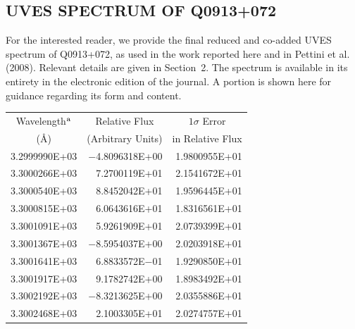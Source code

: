\documentclass[useAMS,usenatbib]{mn2e}
\begin{document}
\newpage
\begin{appendix}
\section{UVES SPECTRUM OF Q0913+072}

For the interested reader, we provide the final 
reduced and co-added UVES spectrum of
Q0913+072, as used in the work reported here and 
in Pettini et al. (2008). Relevant details are given
in Section~2. The spectrum is available
 in its entirety in the electronic edition of 
the journal. A portion is shown here for
guidance regarding its form and content.\\


  \centering
    \begin{tabular}{@{}rrr}
      \hline
    \multicolumn{1}{c}{Wavelength$^{\rm a}$}
& \multicolumn{1}{c}{Relative Flux}
& \multicolumn{1}{c}{$ 1 \sigma$ Error}\\
\multicolumn{1}{c}{(\AA)}
& \multicolumn{1}{c}{(Arbitrary Units)}
& \multicolumn{1}{c}{in Relative Flux}\\
      \hline 
3.2999990E+03  & $-$4.8096318E+00  & 1.9800955E+01\\
3.3000266E+03  & 7.2700119E+01  & 2.1541672E+01\\
3.3000540E+03  & 8.8452042E+01  & 1.9596445E+01 \\
3.3000815E+03  & 6.0643616E+01  & 1.8316561E+01\\
3.3001091E+03  & 5.9261909E+01  & 2.0739399E+01\\
3.3001367E+03  &$-$8.5954037E+00  & 2.0203918E+01\\
3.3001641E+03  & 6.8833572E$-$01  & 1.9290850E+01\\
3.3001917E+03  & 9.1782742E+00  & 1.8983492E+01\\
3.3002192E+03  &$-$8.3213625E+00  & 2.0355886E+01\\
3.3002468E+03  & 2.1003305E+01  & 2.0274757E+01\\
      \hline
    \end{tabular}


\end{appendix}
\end{document}

